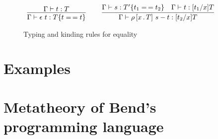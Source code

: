 \documentclass{article}
\begin{document}
\begin{figure}
  \[
  \begin{array}{lllll}
    \infer{\Gamma\vdash\rfl{t} : \eqtm{t}{T}{t}}{\Gamma\vdash t : T}
    &\ &
    \infer{\Gamma\vdash\cng{x}{T}{s}{t} : [t_2/x]T}{\Gamma\vdash s : \eqtm{t_1}{T'}{t_2} & \Gamma \vdash t : [t_1/x]T}
    &\ &
\ %
    \end{array}
  \]
\caption{Typing and kinding rules for equality}
\label{fig:eqtp}
  \end{figure}
  



\section{Examples}



\section{Metatheory of Bend's programming language}
\label{sec:opmeta}



\end{document}
